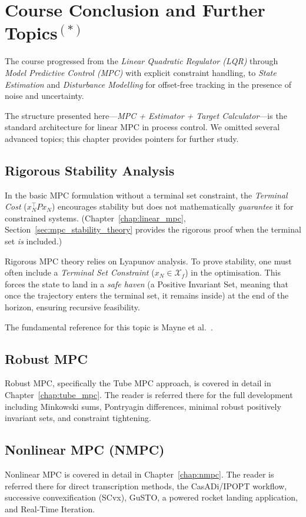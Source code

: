 \chapter{Course Conclusion and Further Topics\texorpdfstring{$^{(*)}$}{(*)}}
\label{chap:conclusion}

The course progressed from the \emph{Linear Quadratic Regulator (LQR)} through \emph{Model Predictive Control (MPC)} with explicit constraint handling, to \emph{State Estimation} and \emph{Disturbance Modelling} for offset-free tracking in the presence of noise and uncertainty.

The structure presented here---\emph{MPC + Estimator + Target Calculator}---is the standard architecture for linear MPC in process control. We omitted several advanced topics; this chapter provides pointers for further study.

\section{Rigorous Stability Analysis}
In the basic MPC formulation without a terminal set constraint, the \emph{Terminal Cost} ($x_N^\top P x_N$) encourages stability but does not mathematically \textit{guarantee} it for constrained systems. (Chapter~\ref{chap:linear_mpc}, Section~\ref{sec:mpc_stability_theory} provides the rigorous proof when the terminal set \emph{is} included.)

Rigorous MPC theory relies on Lyapunov analysis. To prove stability, one must often include a \emph{Terminal Set Constraint} ($x_N \in \mathcal{X}_f$) in the optimisation. This forces the state to land in a \emph{safe haven} (a Positive Invariant Set, meaning that once the trajectory enters the terminal set, it remains inside) at the end of the horizon, ensuring recursive feasibility.

The fundamental reference for this topic is Mayne et al.~\cite{Mayne2000}.

\section{Robust MPC}
Robust MPC, specifically the Tube MPC approach, is covered in detail in Chapter~\ref{chap:tube_mpc}. The reader is referred there for the full development including Minkowski sums, Pontryagin differences, minimal robust positively invariant sets, and constraint tightening.

\section{Nonlinear MPC (NMPC)}
Nonlinear MPC is covered in detail in Chapter~\ref{chap:nmpc}. The reader is referred there for direct transcription methods, the CasADi/IPOPT workflow, successive convexification (SCvx), GuSTO, a powered rocket landing application, and Real-Time Iteration.

